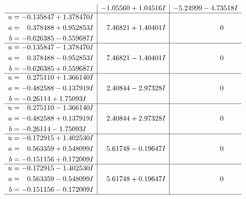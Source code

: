 \documentclass[1p]{elsarticle_modified}
\theoremstyle{definition}
\begin{document}
$$\begin{array}{c|c|c}
 & -1.05560 + 1.04516 I & -5.24999 - 4.73518 I \\ \hline\begin{aligned}
u &= -0.135847 + 1.378470 I \\
a &= \phantom{-}0.378488 + 0.952853 I \\
b &= -0.626385 - 0.559687 I\end{aligned}
 & \phantom{-}7.46821 + 1.40401 I & \phantom{-0.000000 } 0 \\ \hline\begin{aligned}
u &= -0.135847 - 1.378470 I \\
a &= \phantom{-}0.378488 - 0.952853 I \\
b &= -0.626385 + 0.559687 I\end{aligned}
 & \phantom{-}7.46821 - 1.40401 I & \phantom{-0.000000 } 0 \\ \hline\begin{aligned}
u &= \phantom{-}0.275110 + 1.366140 I \\
a &= -0.482588 - 0.137919 I \\
b &= -0.26114 + 1.75093 I\end{aligned}
 & \phantom{-}2.40844 - 2.97328 I & \phantom{-0.000000 } 0 \\ \hline\begin{aligned}
u &= \phantom{-}0.275110 - 1.366140 I \\
a &= -0.482588 + 0.137919 I \\
b &= -0.26114 - 1.75093 I\end{aligned}
 & \phantom{-}2.40844 + 2.97328 I & \phantom{-0.000000 } 0 \\ \hline\begin{aligned}
u &= -0.172915 + 1.402530 I \\
a &= \phantom{-}0.563359 + 0.548099 I \\
b &= -0.151156 + 0.172009 I\end{aligned}
 & \phantom{-}5.61748 - 0.19647 I & \phantom{-0.000000 } 0 \\ \hline\begin{aligned}
u &= -0.172915 - 1.402530 I \\
a &= \phantom{-}0.563359 - 0.548099 I \\
b &= -0.151156 - 0.172009 I\end{aligned}
 & \phantom{-}5.61748 + 0.19647 I & \phantom{-0.000000 } 0\\
 \hline 
 \end{array}$$\newpage$$\begin{array}{c|c|c}  

\end{array}$$
\end{document}
